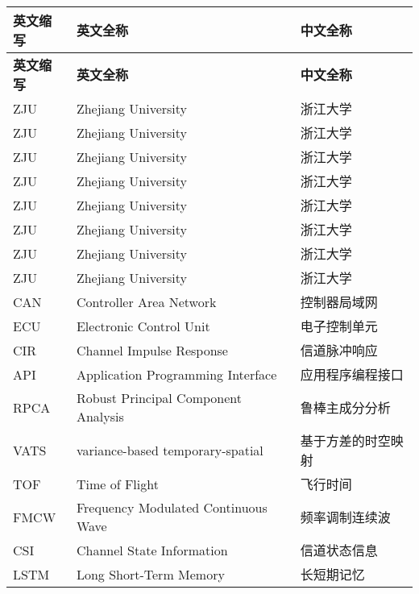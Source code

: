 \cleardoublepage
{}
\begin{center}
    \begin{longtable}{m{2cm}m{8cm}m{5cm}}
        \toprule
        \textbf{英文缩写}&\textbf{英文全称}&\textbf{中文全称}\\
        \midrule
        \endfirsthead
        \toprule
        \textbf{英文缩写}&\textbf{英文全称}&\textbf{中文全称}\\
        \midrule
        \endhead 
        \bottomrule
        \endfoot
        \bottomrule
        \endlastfoot
        ZJU&Zhejiang University&浙江大学\\
        ZJU&Zhejiang University&浙江大学\\
        ZJU&Zhejiang University&浙江大学\\
        ZJU&Zhejiang University&浙江大学\\
        ZJU&Zhejiang University&浙江大学\\
        ZJU&Zhejiang University&浙江大学\\
        ZJU&Zhejiang University&浙江大学\\
        ZJU&Zhejiang University&浙江大学\\
        CAN&Controller Area Network&控制器局域网\\
        ECU&Electronic Control Unit&电子控制单元\\
        CIR&Channel Impulse Response&信道脉冲响应\\
        API&Application Programming Interface&应用程序编程接口\\
        RPCA&Robust Principal Component Analysis&鲁棒主成分分析\\
        VATS&variance-based temporary-spatial&基于方差的时空映射\\
        TOF&Time of Flight&飞行时间\\
        FMCW&Frequency Modulated Continuous Wave&频率调制连续波\\
        CSI&Channel State Information&信道状态信息\\
        LSTM&Long Short-Term Memory&长短期记忆\\
	\end{longtable}
\end{center}